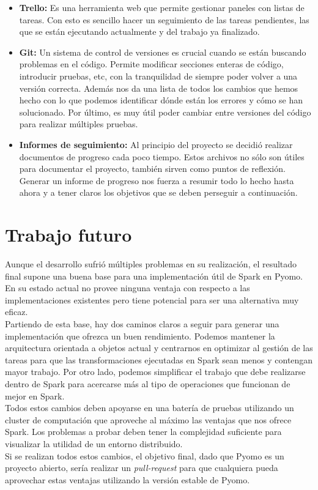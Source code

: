 \begin{itemize}
    \item \textbf{Trello: } Es una herramienta web que permite gestionar paneles con listas de tareas. Con esto es sencillo hacer un seguimiento de las tareas pendientes, las que se están ejecutando actualmente y del trabajo ya finalizado.
    \item \textbf{Git: } Un sistema de control de versiones es crucial cuando se están buscando problemas en el código. Permite modificar secciones enteras de código, introducir pruebas, etc, con la tranquilidad de siempre poder volver a una versión correcta. Además nos da una lista de todos los cambios que hemos hecho con lo que podemos identificar dónde están los errores y cómo se han solucionado. Por último, es muy útil poder cambiar entre versiones del código para realizar múltiples pruebas.
    \item \textbf{Informes de seguimiento: } Al principio del proyecto se decidió realizar documentos de progreso cada poco tiempo. Estos archivos no sólo son útiles para documentar el proyecto, también sirven como puntos de reflexión. Generar un informe de progreso nos fuerza a resumir todo lo hecho hasta ahora y a tener claros los objetivos que se deben perseguir a continuación.
\end{itemize}

\section{Trabajo futuro}

Aunque el desarrollo sufrió múltiples problemas en su realización, el resultado final supone una buena base para una implementación útil de Spark en Pyomo. En su estado actual no provee ninguna ventaja con respecto a las implementaciones existentes pero tiene potencial para ser una alternativa muy eficaz. \\

Partiendo de esta base, hay dos caminos claros a seguir para generar una implementación que ofrezca un buen rendimiento. Podemos mantener la arquitectura orientada a objetos actual y centrarnos en optimizar al gestión de las tareas para que las transformaciones ejecutadas en Spark sean menos y contengan mayor trabajo. Por otro lado, podemos simplificar el trabajo que debe realizarse dentro de Spark para acercarse más al tipo de operaciones que funcionan de mejor en Spark.\\

Todos estos cambios deben apoyarse en una batería de pruebas utilizando un cluster de computación que aproveche al máximo las ventajas que nos ofrece Spark. Los problemas a probar deben tener la complejidad suficiente para visualizar la utilidad de un entorno distribuido.\\

Si se realizan todos estos cambios, el objetivo final, dado que Pyomo es un proyecto abierto, sería realizar un \textit{pull-request} para que cualquiera pueda aprovechar estas ventajas utilizando la versión estable de Pyomo.